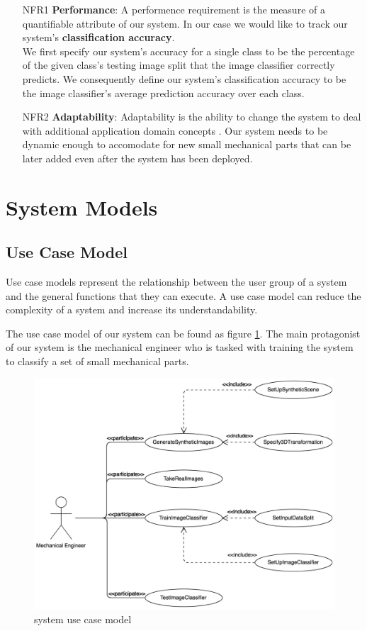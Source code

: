 \documentclass[a4paper,12pt,twoside]{report}
\begin{document}
\begin{itemize}
\item [NFR1] \textbf{Performance}: A performence requirement is the measure of a quantifiable attribute of our system. In our case we would like to track our system's \textbf{classification accuracy}.\\
We first specify our system's accuracy for a single class to be the percentage of the given class's testing image split that the image classifier correctly predicts. We consequently define our system's classification accuracy to be the image classifier's average prediction accuracy over each class.

\item [NFR2] \textbf{Adaptability}: Adaptability is the ability to change the system to deal with additional application domain concepts \cite{bruegge2004object}. Our system needs to be dynamic enough to accomodate for new small mechanical parts that can be later added even after the system has been deployed.
\end{itemize}

\section{System Models}

\subsection{Use Case Model}

Use case models represent the relationship between the user group of a system and the general functions that they can execute. A use case model can reduce the complexity of a system and increase its understandability.

The use case model of our system can be found as figure \ref{fig:UseCaseModel}. The main protagonist of our system is the mechanical engineer who is tasked with training the system to classify a set of small mechanical parts.

\begin{figure}[t]
\centering
  \includegraphics[width=\textwidth]{UseCaseModel}
\caption{system use case model}
\label{fig:UseCaseModel}
\end{figure}
\end{document}
